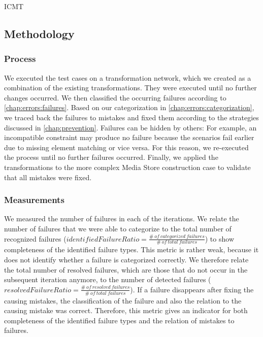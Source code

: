 \begin{copiedFrom}{ICMT}
\subsection{Methodology}

\subsubsection*{Process}
We executed the test cases on a transformation network, which we created as a combination of the existing transformations.
They were executed until no further changes occurred.
We then classified the occurring failures according to \autoref{chap:errors:failures}.
Based on our categorization in \autoref{chap:errors:categorization}, we traced back the failures to mistakes and fixed them according to the strategies discussed in \autoref{chap:prevention}.
Failures can be hidden by others: 
For example, an incompatible constraint may produce no failure because the scenarios fail earlier due to missing element matching or vice versa.
For this reason, we re-executed the process until no further failures occurred.
Finally, we applied the transformations to the more complex Media Store construction case to validate that all mistakes were fixed.

\subsubsection*{Measurements}
We measured the number of failures in each of the iterations.
We relate the number of failures that we were able to categorize to the total number of recognized failures ($\mathit{identifiedFailureRatio} = \frac{\mathit{\#\ of\ categorized\ failures}}{\mathit{\#\ of\ total\ failures}}$) to show completeness of the identified failure types.
This metric is rather weak, because it does not identify whether a failure is categorized correctly.
We therefore relate the total number of resolved failures, which are those that do not occur in the subsequent iteration anymore, to the number of detected failures ($\mathit{resolvedFailureRatio} = \frac{\mathit{\#\ of\ resolved\ failures}}{\mathit{\#\ of\ total\ failures}}$).
If a failure disappears after fixing the causing mistakes, the classification of the failure and also the relation to the causing mistake was correct. %
Therefore, this metric gives an indicator for both completeness of the identified failure types and the relation of mistakes to failures.


\end{copiedFrom}
